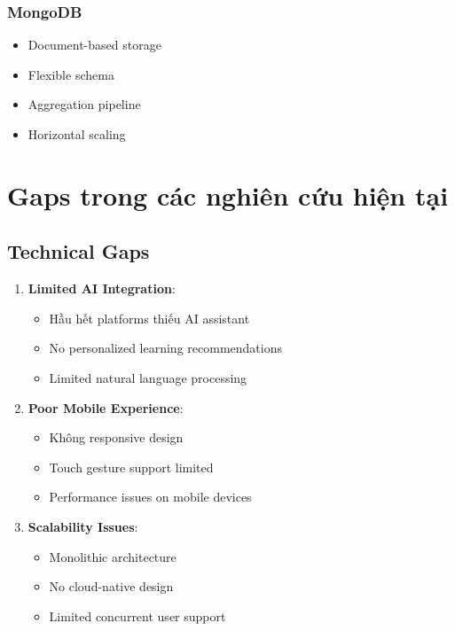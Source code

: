 \subsubsection{MongoDB}
\begin{itemize}
    \item Document-based storage
    \item Flexible schema
    \item Aggregation pipeline
    \item Horizontal scaling
\end{itemize}

\section{Gaps trong các nghiên cứu hiện tại}
\label{sec:research-gaps}

\subsection{Technical Gaps}
\label{subsec:technical-gaps}

\begin{enumerate}
    \item \textbf{Limited AI Integration}:
    \begin{itemize}
        \item Hầu hết platforms thiếu AI assistant
        \item No personalized learning recommendations
        \item Limited natural language processing
    \end{itemize}
    
    \item \textbf{Poor Mobile Experience}:
    \begin{itemize}
        \item Không responsive design
        \item Touch gesture support limited
        \item Performance issues on mobile devices
    \end{itemize}
    
    \item \textbf{Scalability Issues}:
    \begin{itemize}
        \item Monolithic architecture
        \item No cloud-native design
        \item Limited concurrent user support
    \end{itemize}
\end{enumerate}

